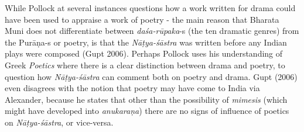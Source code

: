 While Pollock at several instances questions how a work written for drama could have been used to appraise a work of poetry - the main reason that Bharata Muni does not differentiate between \hbox{\textsl{daśa-rūpaka}-s} (the ten dramatic genres) from the Purāṇa-s or poetry, is that the \textsl{Nāṭya-śāstra} was written before any Indian plays were composed (Gupt 2006). Perhaps Pollock uses his understanding of Greek \textsl{Poetics} where there is a clear distinction between drama and poetry, to question how \textsl{Nāṭya-śāstra} can comment both on poetry and drama. Gupt (2006) even disagrees with the notion that poetry may have come to India via Alexander, because he states that other than the possibility of \textsl{mimesis} (which might have developed into \textsl{anukaraṇa}) there are no signs of influence of poetics on \textsl{Nāṭya-śāstra}, or vice-versa. 

